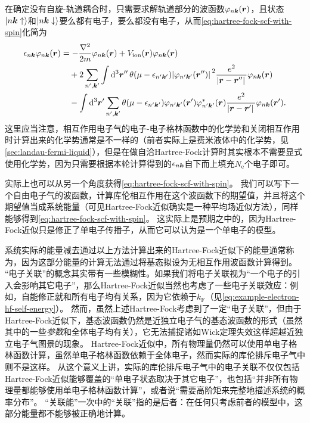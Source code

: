 在确定没有自旋-轨道耦合时，只需要求解轨道部分的波函数$\varphi_{n \vb*{k}}(\vb*{r})$，且状态$\ket{n \vb*{k} \uparrow}$和$\ket{n \vb*{k} \downarrow}$要么都有电子，要么都没有电子，从而\eqref{eq:hartree-fock-scf-with-spin}化简为
\begin{equation}
    \begin{aligned}
        \epsilon_{n \vb*{k}} \varphi_{n \vb*{k}}(\vb*{r}) &= - \frac{\laplacian}{2m} \varphi_{n \vb*{k}}(\vb*{r}) + V_\text{ion}(\vb*{r}) \varphi_{n \vb*{k}}(\vb*{r}) \\
        &\quad + 2 \sum_{n', \vb*{k}'} \int \dd[3]{\vb*{r}''} \theta(\mu - \epsilon_{n' \vb*{k}'}) \abs*{\varphi_{n' \vb*{k}'}(\vb*{r}'' )}^2 \frac{e^2}{\abs*{\vb*{r} - \vb*{r}''}} \varphi_{n \vb*{k}}(\vb*{r} ) \\
        &\quad - \int \dd[3]{\vb*{r}'} \sum_{n', \vb*{k}'} \theta(\mu - \epsilon_{n' \vb*{k}'}) \varphi_{n' \vb*{k}'}(\vb*{r}' ) \varphi^*_{n' \vb*{k}'}(\vb*{r} ) \frac{e^2}{\abs*{\vb*{r} - \vb*{r}'}} \varphi_{n \vb*{k}}(\vb*{r}' ) .
    \end{aligned}
    \label{eq:hartree-fock-scf-spinless}
\end{equation}
这里应当注意，相互作用电子气的电子-电子格林函数中的化学势和关闭相互作用时计算出来的化学势通常是不一样的（前者实际上是费米液体中的化学势，见\autoref{sec:landau-fermi-liquid}），但是在做自洽Hartree-Fock计算时其实根本不需要显式使用化学势，因为只需要根据本轮计算得到的$\epsilon_{n \vb*{k}}$自下而上填充$N_\text{e}$个电子即可。

实际上也可以从另一个角度获得\eqref{eq:hartree-fock-scf-with-spin}。
我们可以写下一个自由电子气的波函数，计算库伦相互作用在这个波函数下的期望值，并且将这个期望值当成系统能量（可见Hartree-Fock近似确实是一种平均场近似方法），同样能够得到\eqref{eq:hartree-fock-scf-with-spin}。
这实际上是预期之中的，因为Hartree-Fock近似只是修正了单电子传播子，从而它可以认为是一个单电子的模型。

系统实际的能量减去通过以上方法计算出来的Hartree-Fock近似下的能量通常称为，因为这部分能量的计算无法通过将基态拟设为无相互作用波函数计算得到。
“电子关联”的概念其实带有一些模糊性。如果我们将电子关联视为“一个电子的引入会影响其它电子”，那么Hartree-Fock近似当然也考虑了一些电子关联效应：例如，自能修正就和所有电子均有关系，因为它依赖于$k_\text{F}$（见\eqref{eq:example-electron-hf-self-energy}）。
然而，虽然上述Hartree-Fock考虑到了一定“电子关联”，但由于Hartree-Fock近似下，基态波函数仍然是近独立电子气的基态波函数的形式（虽然其中的一些\emph{参数}和全体电子均有关），它无法捕捉诸如Wick定理失效这样超越近独立电子气图景的现象。
Hartree-Fock近似中，所有物理量仍然可以使用单电子格林函数计算，虽然单电子格林函数依赖于全体电子，然而实际的库伦排斥电子气中则不是这样。
从这个意义上讲，实际的库伦排斥电子气中的电子关联不仅仅包括Hartree-Fock近似能够覆盖的“单电子状态取决于其它电子”，也包括“并非所有物理量都能够使用单电子格林函数计算”，或者说“需要高阶矩来完整地描述系统的概率分布”。
“关联能”一次中的“关联”指的是后者：在任何只考虑前者的模型中，这部分能量都不能够被正确地计算。

